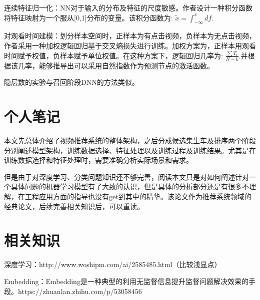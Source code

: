 \documentclass[UTF8]{ctexart}
\begin{document}
	连续特征归一化：NN对于输入的分布及特征的尺度敏感。作者设计一种积分函数将特征映射为一个服从[0,1]分布的变量。该积分函数为: $\tilde{x} = \int_{-\infty}^{x}df $.

	对观看时间建模：划分样本空间时，正样本为有点击视频，负样本为无点击视频，作者采用一种加权逻辑回归基于交叉熵损失进行训练。加权方案为，正样本用观看时间赋予权值，负样本赋予单位权值。在这种方案下，逻辑回归几率为: $\frac{\sum T_i}{N-k} $.并根据该几率，能够推导出可以采用自然指数作为预测节点的激活函数。

	隐层数的实验与召回阶段DNN的方法类似。
	\clearpage
	\section{个人笔记}\label{sec:diqijie}
	本文先总体介绍了视频推荐系统的整体架构，之后分成候选集生车及排序两个阶段分别阐述模型架构，训练数据选择、特征处理以及训练过程及训练结果。尤其是在训练数据选择和特征处理时，需要准确分析实际场景和需求。

	但是由于对深度学习、分类问题知识还不够完善，阅读本文只是对如何阐述针对一个具体问题的机器学习模型有了大致的认识，但是具体的分析部分还是有很多不理解，在工程应用方面的指导也没有get到其中的精华。该论文作为推荐系统领域的经典论文，后续完善相关知识后，可以重读。
	\clearpage
	\section{相关知识}\label{sec:diqijie}
	
	深度学习：http://www.woshipm.com/ai/2585485.html（比较浅显点）

	Embedding：Embedding是一种典型的利用无监督信息提升监督问题解决效果的手段。https://zhuanlan.zhihu.com/p/53058456
	\clearpage
	
\end{document}

